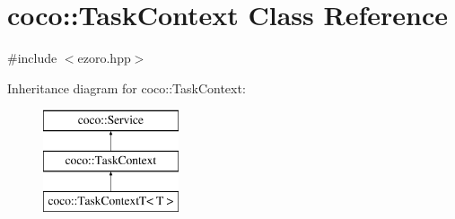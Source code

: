 \hypertarget{classcoco_1_1_task_context}{\section{coco\-:\-:Task\-Context Class Reference}
\label{classcoco_1_1_task_context}
}


{\ttfamily \#include $<$ezoro.\-hpp$>$}

Inheritance diagram for coco\-:\-:Task\-Context\-:\begin{figure}[H]
\begin{center}
\leavevmode
\includegraphics[height=3.000000cm]{classcoco_1_1_task_context}
\end{center}
\end{figure}
